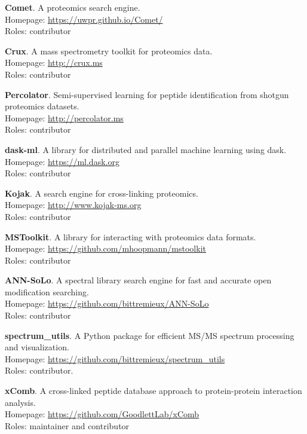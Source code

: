 \documentclass[11pt]{article}
\newcommand{\myref}[1]{\href{#1}{\url{#1}}}
\begin{document}
\begin{etaremune}
  \item \textbf{Comet}. A proteomics search engine. \\
  Homepage: \myref{https://uwpr.github.io/Comet/} \\
  Roles: contributor

  \item \textbf{Crux}. A mass spectrometry toolkit for proteomics data. \\
  Homepage: \myref{http://crux.ms} \\
  Roles: contributor

  \item \textbf{Percolator}. Semi-supervised learning for peptide
  identification from shotgun proteomics datasets. \\
  Homepage: \myref{http://percolator.ms} \\
  Roles: contributor

  \item \textbf{dask-ml}. A library for distributed and parallel machine
  learning using dask. \\
  Homepage: \myref{https://ml.dask.org} \\
  Roles: contributor

  \item \textbf{Kojak}. A search engine for cross-linking proteomics. \\
  Homepage: \myref{http://www.kojak-ms.org} \\
  Roles: contributor

  \item \textbf{MSToolkit}. A library for interacting with proteomics data formats. \\
  Homepage: \myref{https://github.com/mhoopmann/mstoolkit} \\
  Roles: contributor

  \item \textbf{ANN-SoLo}. A spectral library search engine for fast and
  accurate open modification searching. \\
  Homepage: \myref{https://github.com/bittremieux/ANN-SoLo} \\
  Roles: contributor
   
  \item \textbf{spectrum\_utils}. A Python package for efficient MS/MS spectrum
  processing and visualization. \\
  Homepage: \myref{https://github.com/bittremieux/spectrum_utils} \\
  Roles: contributor.

  \item \textbf{xComb}. A cross-linked peptide database approach to
  protein-protein interaction analysis. \\
  Homepage: \myref{https://github.com/GoodlettLab/xComb} \\
  Roles: maintainer and contributor

\end{etaremune}
\end{document}
